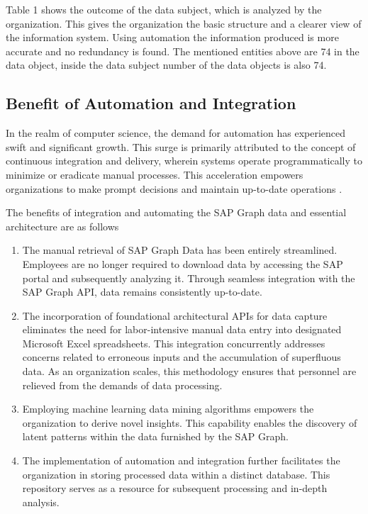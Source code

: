 \documentclass{article}
\begin{document}
Table 1 shows the outcome of the data subject, which is analyzed by the organization. This gives the organization the basic structure and a clearer view of the information system. Using automation the information produced is more accurate and no redundancy is found. The mentioned entities above are 74 in the data object, inside the data subject number of the data objects is also 74. 

\maketitle
\subsection{Benefit of Automation and Integration}

In the realm of computer science, the demand for automation has experienced swift and significant growth. This surge is primarily attributed to the concept of continuous integration and delivery, wherein systems operate programmatically to minimize or eradicate manual processes. This acceleration empowers organizations to make prompt decisions and maintain up-to-date operations \parencite{wilcox2015}. 

The benefits of integration and automating the SAP Graph data and essential architecture are as follows

\begin{enumerate}
    \item The manual retrieval of SAP Graph Data has been entirely streamlined. Employees are no longer required to download data by accessing the SAP portal and subsequently analyzing it. Through seamless integration with the SAP Graph API, data remains consistently up-to-date.
    
    \item The incorporation of foundational architectural APIs for data capture eliminates the need for labor-intensive manual data entry into designated Microsoft Excel spreadsheets. This integration concurrently addresses concerns related to erroneous inputs and the accumulation of superfluous data. As an organization scales, this methodology ensures that personnel are relieved from the demands of data processing.
    
    \item Employing machine learning data mining algorithms empowers the organization to derive novel insights. This capability enables the discovery of latent patterns within the data furnished by the SAP Graph.
    
    \item The implementation of automation and integration further facilitates the organization in storing processed data within a distinct database. This repository serves as a resource for subsequent processing and in-depth analysis.
\end{enumerate}
\end{document}
